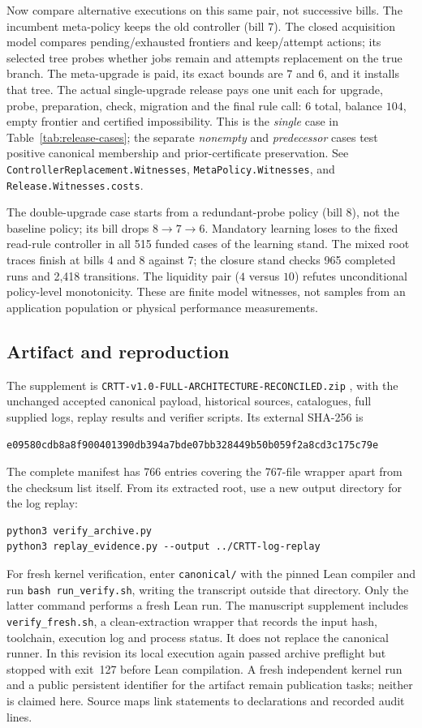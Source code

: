 \documentclass[10pt,letterpaper]{article}
\newcommand{\rc}[1]{\texttt{#1}}
\begin{document}
Now compare alternative executions on this same pair, not successive bills. The incumbent meta-policy keeps the old controller (bill $7$). The closed acquisition model compares pending/exhausted frontiers and keep/attempt actions; its selected tree probes whether jobs remain and attempts replacement on the true branch. The meta-upgrade is paid, its exact bounds are $7$ and $6$, and it installs that tree. The actual single-upgrade release pays one unit each for upgrade, probe, preparation, check, migration and the final rule call: $6$ total, balance $104$, empty frontier and certified impossibility. This is the \emph{single} case in Table~\ref{tab:release-cases}; the separate \emph{nonempty} and \emph{predecessor} cases test positive canonical membership and prior-certificate preservation. See \rc{ControllerReplacement.Witnesses}, \rc{MetaPolicy.Witnesses}, and \rc{Release.Witnesses.costs}.

The double-upgrade case starts from a redundant-probe policy (bill $8$), not the baseline policy; its bill drops $8\to7\to6$. Mandatory learning loses to the fixed read-rule controller in all 515 funded cases of the learning stand. The mixed root traces finish at bills 4 and 8 against 7; the closure stand checks 965 completed runs and 2,418 transitions. The liquidity pair ($4$ versus $10$) refutes unconditional policy-level monotonicity. These are finite model witnesses, not samples from an application population or physical performance measurements.

\newpage
\subsection{Artifact and reproduction}\label{sec:artifact}
The supplement is \rc{CRTT-v1.0-FULL-ARCHITECTURE-RECONCILED.zip} \cite{crttartifact}, with the unchanged accepted canonical payload, historical sources, catalogues, full supplied logs, replay results and verifier scripts. Its external SHA-256 is
\begin{center}\small\texttt{e09580cdb8a8f900401390db394a7bde07bb328449b50b059f2a8cd3c175c79e}\end{center}
The complete manifest has 766 entries covering the 767-file wrapper apart from the checksum list itself. From its extracted root, use a new output directory for the log replay:
\begin{verbatim}
python3 verify_archive.py
python3 replay_evidence.py --output ../CRTT-log-replay
\end{verbatim}
For fresh kernel verification, enter \rc{canonical/} with the pinned Lean compiler and run \verb|bash run_verify.sh|, writing the transcript outside that directory. Only the latter command performs a fresh Lean run. The manuscript supplement includes \rc{verify\_fresh.sh}, a clean-extraction wrapper that records the input hash, toolchain, execution log and process status. It does not replace the canonical runner. In this revision its local execution again passed archive preflight but stopped with exit~127 before Lean compilation. A fresh independent kernel run and a public persistent identifier for the artifact remain publication tasks; neither is claimed here. Source maps link statements to declarations and recorded audit lines.
\end{document}
